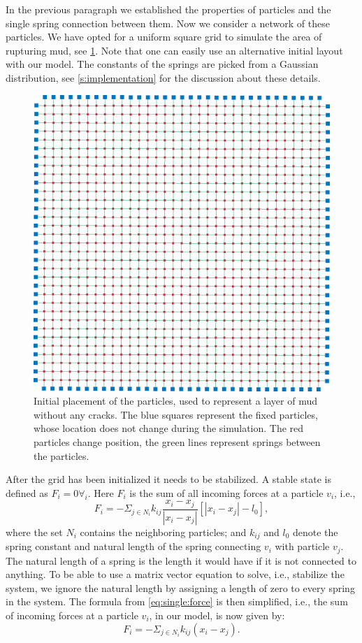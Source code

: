 In the previous paragraph we established the properties of particles and the single spring connection between them. Now we consider a network of these particles. We have opted for a uniform square grid to simulate the area of rupturing mud, see \cref{fig:model:layout}. Note that one can easily use an alternative initial layout with our model. The constants of the springs are picked from a Gaussian distribution, see \cref{s:implementation} for the discussion about these details.
%
\begin{figure}
	\centering
	\includegraphics[width=0.9\columnwidth]{img/uniform_square_grid.png}
	\caption{Initial placement of the particles, used to represent a layer of mud without any cracks. The blue squares represent the fixed particles, whose location does not change during the simulation. The red particles change position, the green lines represent springs between the particles.}
	\label{fig:model:layout}
\end{figure}

After the grid has been initialized it needs to be stabilized. A stable state is defined as $F_i = 0 \forall_i$. Here $F_i$ is the sum of all incoming forces at a particle $v_i$, i.e.,
%
\begin{equation}\label{eq:single:force}
	F_i = - \Sigma_{j \in N_i} k_{ij} \frac{x_i - x_j}{|x_i - x_j|}[|x_i - x_j| - l_0],
\end{equation}
%
where the set $N_i$ contains the neighboring particles; and $k_{ij}$ and $l_0$ denote the spring constant and natural length of the spring connecting $v_i$ with 
particle $v_j$. The natural length of a spring is the length it would have if it is not connected to anything. To be able to use a matrix vector equation to solve, i.e., stabilize the system, we ignore the natural length by assigning a length of zero to every spring in the system. The formula from \eqref{eq:single:force} is then simplified, i.e., the sum of incoming forces at a particle $v_i$, in our model, is now given by:
%
\begin{equation}\label{eq:single:force:simple}
	F_i = - \Sigma_{j \in N_i} k_{ij}(x_i - x_j).
\end{equation}

